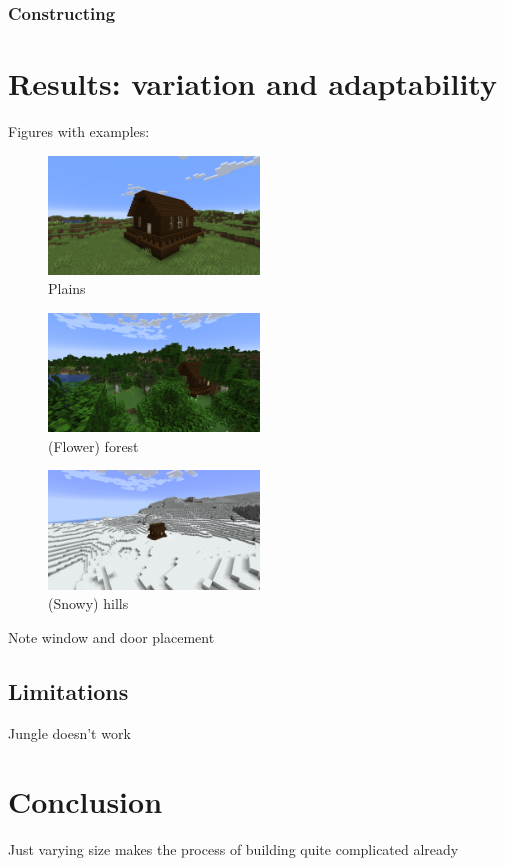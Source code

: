 \documentclass[10pt]{article}
\begin{document}
\subsubsection{Constructing}

\section{Results: variation and adaptability}
Figures with examples:
\begin{figure}
    \includegraphics[width=0.5\textwidth]{../screenshots/plains.png}
    \centering
    \caption{Plains}
    \label{fig:plains}
\end{figure}
\begin{figure}
    \includegraphics[width=0.5\textwidth]{../screenshots/forest.png}
    \centering
	\caption{(Flower) forest}
    \label{fig:forest}
\end{figure}
\begin{figure}
    \includegraphics[width=0.5\textwidth]{../screenshots/hills.png}
    \centering
	\caption{(Snowy) hills}
    \label{fig:hills}
\end{figure}

Note window and door placement

\subsection{Limitations}
Jungle doesn't work

\section{Conclusion}
Just varying size makes the process of building quite complicated already

\printbibliography
\end{document}
